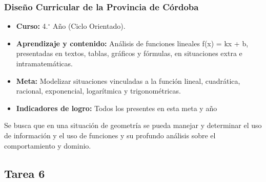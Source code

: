 \documentclass[11pt,a4paper]{article}
\begin{document}
\subsubsection{Diseño Curricular de la Provincia de Córdoba}
\begin{itemize}
    \item \textbf{Curso:} 4.$^{\circ}$ Año (Ciclo Orientado).
    \item \textbf{Aprendizaje y contenido:} Análisis de funciones lineales f(x) = kx + b, presentadas en textos, tablas, gráficos y fórmulas, en situaciones extra e intramatemáticas.
    \item \textbf{Meta:} Modelizar situaciones vinculadas a la función lineal, cuadrática, racional, exponencial, logarítmica y trigonométricas.
    \item \textbf{Indicadores de logro:} Todos los presentes en esta meta y año
\end{itemize}

Se busca que en una situación de geometría se pueda manejar y determinar el uso de información y el uso de funciones y su profundo análisis sobre el comportamiento y dominio.
\subsection{Tarea 6}
\end{document}
